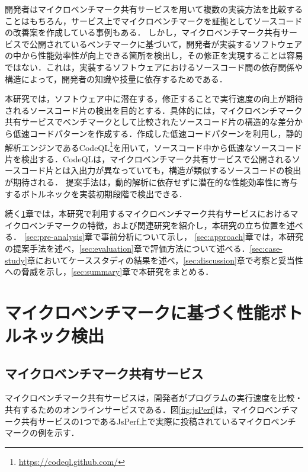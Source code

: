 \documentclass[submit,techrep,noauthor]{ipsj}
\begin{document}
開発者はマイクロベンチマーク共有サービスを用いて複数の実装方法を比較することはもちろん，サービス上でマイクロベンチマークを証拠としてソースコードの改善案を作成している事例もある\cite{saiki}．
しかし，マイクロベンチマーク共有サービスで公開されているベンチマークに基づいて，開発者が実装するソフトウェアの中から性能効率性が向上できる箇所を検出し，その修正を実現することは容易ではない．これは，実装するソフトウェアにおけるソースコード間の依存関係や構造によって，開発者の知識や技量に依存するためである．

本研究では，ソフトウェア中に潜在する，修正することで実行速度の向上が期待されるソースコード片の検出を目的とする．具体的には，マイクロベンチマーク共有サービスでベンチマークとして比較されたソースコード片の構造的な差分から低速コードパターンを作成する．作成した低速コードパターンを利用し，静的解析エンジンであるCodeQL\footnote{\url{https://codeql.github.com/}}\cite{ql}を用いて，ソースコード中から低速なソースコード片を検出する．CodeQLは，マイクロベンチマーク共有サービスで公開されるソースコード片とは入出力が異なっていても，構造が類似するソースコードの検出が期待される．
提案手法は，動的解析に依存せずに潜在的な性能効率性に寄与するボトルネックを実装初期段階で検出できる．

続く\ref{sec:background}章では，本研究で利用するマイクロベンチマーク共有サービスにおけるマイクロベンチマークの特徴，および関連研究を紹介し，本研究の立ち位置を述べる． \ref{sec:pre-analysis}章で事前分析について示し， \ref{sec:approach}章では，本研究の提案手法を述べ，\ref{sec:evaluation}章で評価方法について述べる．\ref{sec:case-study}章においてケーススタディの結果を述べ，\ref{sec:discussion}章で考察と妥当性への脅威を示し，\ref{sec:summary}章で本研究をまとめる． 


\section{マイクロベンチマークに基づく性能ボトルネック検出}
\label{sec:background}

\subsection{マイクロベンチマーク共有サービス}


マイクロベンチマーク共有サービスは，開発者がプログラムの実行速度を比較・共有するためのオンラインサービスである．図\ref{fig:jsPerf}は，マイクロベンチマーク共有サービスの1つであるJsPerf上で実際に投稿されているマイクロベンチマークの例を示す．
\end{document}
